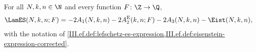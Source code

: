 For all $N,k,n\in\N$ and every function $F\colon\Z\to\Q$,
\[
  \LamES(N,k,n;F)=-2A_1(N,k,n)-2A_2^{\mathrm E}(k,n;F)-2A_3(N,k,n)-\Eist(N,k,n),
\]
with the notation of \cref{III.ef.def:lefschetz-es-expression,III.ef.def:eisenstein-expression-corrected}.
